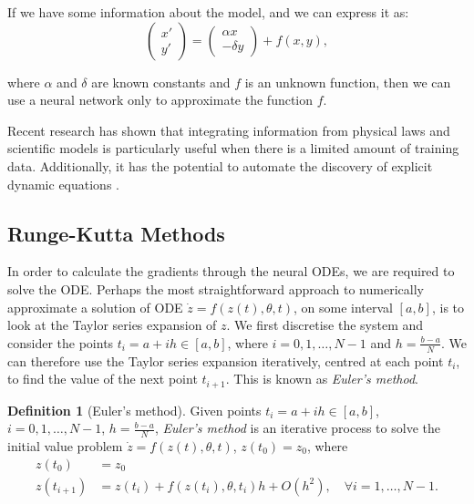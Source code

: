 \documentclass[a4paper,11pt,titlepage]{article}
\theoremstyle{definition}
\newtheorem{definition}{Definition}[section]
\theoremstyle{plain}
\theoremstyle{remark}
\begin{document}
If we have some information about the model, and we can express it as:
$$
\begin{pmatrix}x'\\ y'
\end{pmatrix}=\begin{pmatrix}\alpha x\\-\delta y\end{pmatrix}+f(x,y),
$$

where $\alpha$ and $\delta$ are known constants and $f$ is an unknown function, then we can use a neural network only to approximate the function $f$. 

Recent research has shown that integrating information from physical laws and scientific models is particularly useful when there is a limited amount of training data. Additionally, it has the potential to automate the discovery of explicit dynamic equations \cite{rackauckas2020universal}.

\subsection{Runge-Kutta Methods}
\label{sec:rungekutta}

In order to calculate the gradients through the neural ODEs, we are required to solve the ODE. Perhaps the most straightforward approach to numerically approximate a solution of ODE $\dot{z}= f(z(t), \theta,t)$, on some interval $\left[a, b\right]$, is to look at the Taylor series expansion of $z$. We first discretise the system and consider the points $t_i = a + ih \in \left[a, b\right]$, where $i = 0, 1, \dots, N - 1$ and $h = \frac{b-a}{N}$. We can therefore use the Taylor series expansion iteratively, centred at each point $t_i$, to find the value of the next point $t_{i + 1}$. This is known as \textit{Euler's method}.

\begin{definition}[Euler's method]
    Given points $t_i = a + ih \in \left[a, b\right]$, $i = 0, 1, \dots, N - 1$, $h = \frac{b-a}{N}$, \textit{Euler's method} is an iterative process to solve the initial value problem $\dot{z}= f(z(t), \theta,t)$, $z(t_0) = z_0$, where
    \begin{align*}
        z(t_0) &= z_0 \\
        z(t_{i+1}) &= z(t_i) + f(z(t_{i}), \theta, t_i)h + O(h^2),\quad\forall i = 1, \dots, N - 1.
    \end{align*}
\end{definition}
\end{document}
